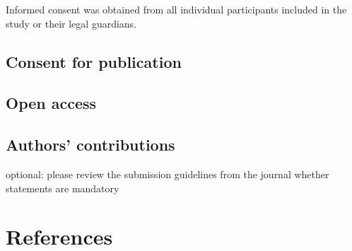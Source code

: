 \documentclass[
  man,floatsintext]{apa6}
\begin{document}
Informed consent was obtained from all individual participants included in the study or their legal guardians.

\hypertarget{consent-for-publication}{%
\subsection{Consent for publication}\label{consent-for-publication}}

\hypertarget{open-access}{%
\subsection{Open access}\label{open-access}}

\hypertarget{authors-contributions}{%
\subsection{Authors' contributions}\label{authors-contributions}}

optional: please review the submission guidelines from the journal whether statements are mandatory

\newpage

\hypertarget{references}{%
\section{References}\label{references}}

\begingroup
\setlength{\parindent}{-0.5in}
\setlength{\leftskip}{0.5in}
\end{document}
